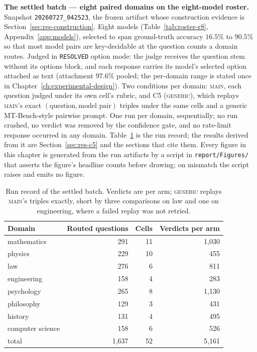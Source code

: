 \textbf{The settled batch --- eight paired domains on the eight-model
roster.} Snapshot \texttt{20260727\_042523}, the frozen artifact whose
construction evidence is Section~\ref{sec:res-construction}. Eight
models (Table~\ref{tab:roster-r8},
Appendix~\ref{app:models}), selected to span ground-truth accuracy
$16.5\%$ to $90.5\%$ so that most model pairs are key-decidable at the
question counts a domain routes. Judged in \texttt{RESOLVED} option
mode: the judge receives the question stem without its options block,
and each response carries its model's selected option attached as text
(attachment $97.6\%$ pooled; the per-domain range is stated once in
Chapter~\ref{ch:experimental-design}). Two conditions per domain:
\textsc{main}, each question judged under its own cell's rubric, and
C5 (\textsc{generic}), which replays \textsc{main}'s exact
$(\text{question}, \text{model pair})$ triples under the same cells and
a generic MT-Bench-style pairwise prompt. One run per domain,
sequentially; no run crashed, no verdict was removed by
the confidence gate, and no rate-limit response occurred in any domain.
Table~\ref{tab:run-record} is the run record; the results derived from
it are Section~\ref{sec:res-c5} and the sections that cite them. Every
figure in this chapter is generated from the run artifacts by a script
in \texttt{report/Figures/} that asserts the figure's headline counts
before drawing; on mismatch the script raises and emits no figure.

\begin{table}[htbp]
\centering
\caption{Run record of the settled batch. Verdicts are per arm;
\textsc{generic} replays \textsc{main}'s triples exactly, short by
three comparisons on law and one on engineering, where a failed replay
was not retried.}
\label{tab:run-record}
\begin{tabular}{lrrr}
\toprule
Domain & Routed questions & Cells & Verdicts per arm \\
\midrule
mathematics      & 291 & 11 & 1{,}030 \\
physics          & 229 & 10 & 455 \\
law              & 276 & 6  & 811 \\
engineering      & 158 & 4  & 283 \\
psychology       & 265 & 8  & 1{,}130 \\
philosophy       & 129 & 3  & 431 \\
history          & 131 & 4  & 495 \\
computer science & 158 & 6  & 526 \\
\midrule
total            & 1{,}637 & 52 & 5{,}161 \\
\bottomrule
\end{tabular}
\end{table}

